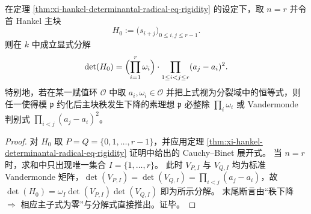 \begin{corollary}\label{cor:xi-hankel-first-block-determinant-discriminant-weight}
在定理 \ref{thm:xi-hankel-determinantal-radical-eq-rigidity} 的设定下，取 \(n=r\) 并令首 Hankel 主块
\[
H_0:=\bigl(s_{i+j}\bigr)_{0\le i,j\le r-1}.
\]
则在 \(k\) 中成立显式分解
\[
\det(H_0)
=
\Bigl(\prod_{i=1}^{r}\omega_i\Bigr)\cdot
\prod_{1\le i<j\le r}(a_j-a_i)^2.
\]
特别地，若在某一赋值环 \(\mathcal O\) 中取 \(a_i,\omega_i\in\mathcal O\) 并把上式视为分裂域中的恒等式，则任一使得模 \(\mathfrak p\) 约化后主块秩发生下降的素理想 \(\mathfrak p\) 必整除 \(\prod_i\omega_i\) 或 Vandermonde 判别式 \(\prod_{i<j}(a_j-a_i)^2\)。
\end{corollary}
\begin{proof}
对 \(H_0\) 取 \(P=Q=\{0,1,\dots,r-1\}\)，并应用定理 \ref{thm:xi-hankel-determinantal-radical-eq-rigidity} 证明中给出的 Cauchy--Binet 展开式。
当 \(n=r\) 时，求和中只出现唯一集合 \(I=\{1,\dots,r\}\)。
此时 \(V_{P,I}\) 与 \(V_{Q,I}\) 均为标准 Vandermonde 矩阵，\(\det(V_{P,I})=\det(V_{Q,I})=\prod_{i<j}(a_j-a_i)\)，故
\(
\det(H_0)=\omega_{I}\det(V_{P,I})\det(V_{Q,I})
\)
即为所示分解。
末尾断言由“秩下降 \(\Rightarrow\) 相应主子式为零”与分解式直接推出。证毕。
\end{proof}

